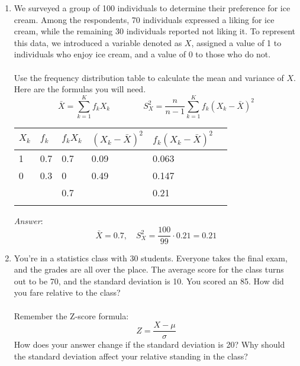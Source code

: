 \documentclass{./../handout}
\begin{document}
\thispagestyle{plain}
\begin{center}
\end{center}	

\begin{enumerate}
\item We surveyed a group of 100 individuals to determine their preference for ice cream. Among the respondents, 70 individuals expressed a liking for ice cream, while the remaining 30 individuals reported not liking it. To represent this data, we introduced a variable denoted as $X$, assigned a value of 1 to individuals who enjoy ice cream, and a value of 0 to those who do not.  \\~\\
Use the frequency distribution table to calculate the mean and variance of $X$. Here are the formulas you will need.
$$ \bar{X} = \sum_{k=1}^K f_k X_k \quad \quad \quad \quad S^2_X = \frac{n}{n-1} \sum_{k=1}^K f_k (X_k-\bar{X})^2 $$

\begin{tabularx}{0.8\textwidth}{p{1cm}p{1cm}YYYY}
\toprule
$X_k$ & $f_k$ & $f_k X_k$ & $(X_k-\bar{X})^2$ & $f_k(X_k-\bar{X})^2$\\
 & 0.7 & 0.7 & 0.09 & 0.063 \\
0 & 0.3 & 0 & 0.49 & 0.147 \\ \midrule
 & & 0.7 &  & 0.21 \\
\bottomrule \\
\end{tabularx}

\textit{Answer}: $$ \bar{X} = 0.7, \quad  S^2_X = \frac{100}{99} \cdot 0.21 = 0.21 $$

\newpage
\item You're in a statistics class with 30 students. Everyone takes the final exam, and the grades are all over the place. The average score for the class turns out to be 70, and the standard deviation is 10. You scored an 85. How did you fare relative to the class? \\~\\
Remember the Z-score formula:
$$ Z = \frac{X-\mu}{\sigma}   $$
How does your answer change if the standard deviation is 20? Why should the standard deviation affect your relative standing in the class? \\


\end{enumerate}
\end{document}
